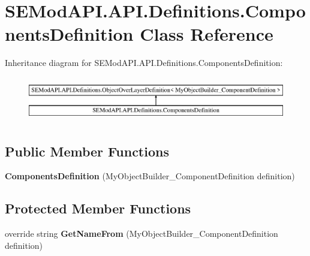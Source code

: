 \hypertarget{class_s_e_mod_a_p_i_1_1_a_p_i_1_1_definitions_1_1_components_definition}{}\section{S\+E\+Mod\+A\+P\+I.\+A\+P\+I.\+Definitions.\+Components\+Definition Class Reference}
\label{class_s_e_mod_a_p_i_1_1_a_p_i_1_1_definitions_1_1_components_definition}
Inheritance diagram for S\+E\+Mod\+A\+P\+I.\+A\+P\+I.\+Definitions.\+Components\+Definition\+:\begin{figure}[H]
\begin{center}
\leavevmode
\includegraphics[height=1.978799cm]{class_s_e_mod_a_p_i_1_1_a_p_i_1_1_definitions_1_1_components_definition}
\end{center}
\end{figure}
\subsection*{Public Member Functions}
\begin{DoxyCompactItemize}
\item 
\hypertarget{class_s_e_mod_a_p_i_1_1_a_p_i_1_1_definitions_1_1_components_definition_a74a898aa693e0a04a5dafa809c4a4849}{}{\bfseries Components\+Definition} (My\+Object\+Builder\+\_\+\+Component\+Definition definition)\label{class_s_e_mod_a_p_i_1_1_a_p_i_1_1_definitions_1_1_components_definition_a74a898aa693e0a04a5dafa809c4a4849}

\end{DoxyCompactItemize}
\subsection*{Protected Member Functions}
\begin{DoxyCompactItemize}
\item 
\hypertarget{class_s_e_mod_a_p_i_1_1_a_p_i_1_1_definitions_1_1_components_definition_a1a0d54d8995d6cfd10f25b68542c8b37}{}override string {\bfseries Get\+Name\+From} (My\+Object\+Builder\+\_\+\+Component\+Definition definition)\label{class_s_e_mod_a_p_i_1_1_a_p_i_1_1_definitions_1_1_components_definition_a1a0d54d8995d6cfd10f25b68542c8b37}

\end{DoxyCompactItemize}
